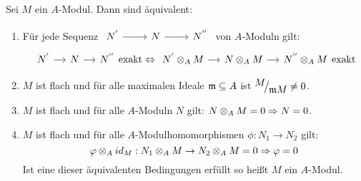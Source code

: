 \begin{bem+df} \label{13.25}
	Sei $M$ ein $A$-Modul. Dann sind äquivalent: 
	\begin{enumerate} [label= \roman*)]
		\item Für jede Sequenz $\begin{tikzcd} N^{'} \arrow{r} & N \arrow{r} & N^{''} \end{tikzcd}$ von $A$-Moduln gilt: \\
		$$ \begin{tikzcd}[column sep = small] N^{'} \arrow{r} & N \arrow{r} & N^{''} \end{tikzcd} \text{exakt} \Lra \begin{tikzcd}[column sep = small] N^{'} \otimes_A M \arrow{r} & N \otimes_A M \arrow{r} & N^{''} \otimes_A M \end{tikzcd} \text{exakt} $$
		\item $M$ ist flach und für alle maximalen Ideale $\mathfrak{m} \subseteq A $ ist $\QR{M}{\m M} \neq 0 $.
		\item $M$ ist flach und für alle $A$-Moduln $N$ gilt: $N \otimes_A M = 0 \Rightarrow N = 0 $.
		\item $M$ ist flach und für alle $A$-Modulhomomorphismen $\phi: N_1 \to N_2 $ gilt: 
		$$ \varphi \otimes_A id_M : N_1 \otimes_A M \to N_2 \otimes_A M = 0 \Rightarrow \varphi = 0 $$ 
		Ist eine dieser äquivalenten Bedingungen erfüllt so heißt $M$ ein  $A$-Modul. 
	\end{enumerate}
\end{bem+df}
